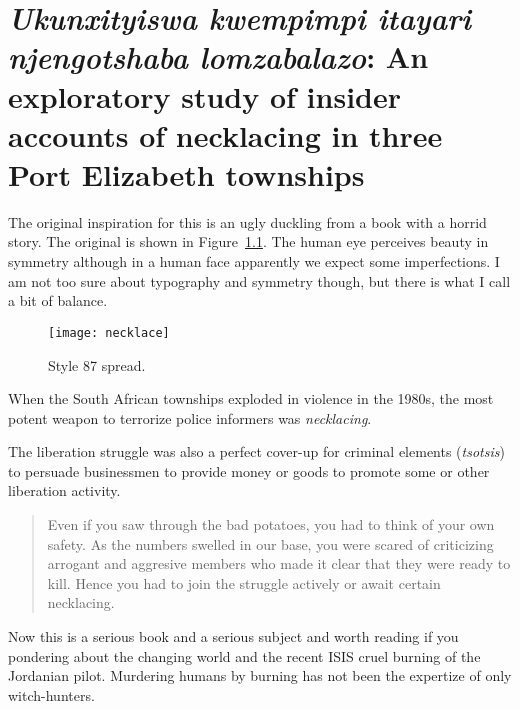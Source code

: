 
\def\authorblockformat{\hfill\hfill}
\MakePercentComment

\chapter[Template 87]{{\itshape Ukunxityiswa kwempimpi itayari\\
                                 njengotshaba lomzabalazo}: An\\
                                 exploratory study of insider\\
                                 accounts of necklacing in three\\
                                 Port Elizabeth townships}
\thispagestyle{plain}
\pagestyle{headings}
The original inspiration for this is an ugly duckling from a book with a horrid story. The original is shown in Figure~\ref{necklacing}.
The human eye perceives beauty in symmetry although in a human face apparently we expect some imperfections.
I am not too sure about typography and symmetry though, but there is what I call a bit of balance. 

\begin{figure}[ht]
\centering
\texttt{[image: necklace]}
\caption{Style 87 spread.}
\label{necklacing}
\end{figure}


When the South African townships exploded in violence in the 1980s, the most potent weapon to terrorize
police informers was \emph{necklacing}. 

The liberation struggle was also a perfect cover-up for criminal elements (\emph{tsotsis}) to persuade businessmen to provide money or goods to promote some or other liberation activity. 

%

\begin{quotation}
Even if you saw through the bad potatoes, you had to think of your own safety. As the numbers swelled in our base,
you were scared of criticizing arrogant and aggresive members who made it clear that they were ready to kill. Hence you had to join the struggle actively or await certain necklacing. 
\end{quotation}

Now this is a serious book and a serious subject and worth reading if you pondering about the changing world and the recent ISIS cruel burning of the Jordanian pilot. Murdering humans by burning has not been the expertize of only witch-hunters.

